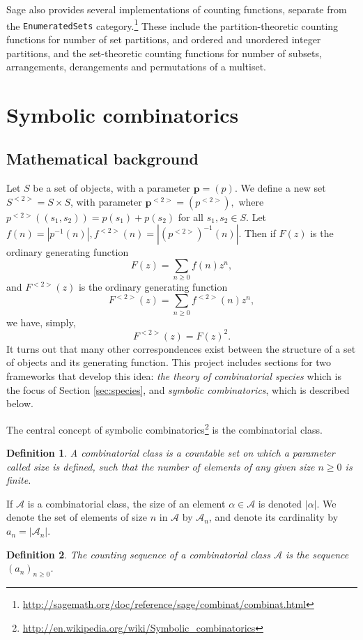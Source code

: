 \documentclass[12pt]{article}
\theoremstyle{plain}
\newtheorem{defin}{Definition}
\newcommand{\codefont}[1]{{\fontshape{n}\texttt{#1}}}
\begin{document}
Sage also provides several implementations of counting functions, separate from the \codefont{EnumeratedSets} category.\footnote{
 \url{http://sagemath.org/doc/reference/sage/combinat/combinat.html}
}
These include the partition-theoretic counting functions for number of set partitions, and ordered and unordered integer partitions,
and the set-theoretic counting functions for number of subsets, arrangements, derangements and permutations of a multiset.





\section{Symbolic combinatorics}
\label{sec:symboliccombinatorics}
\subsection{Mathematical background}
\label{sec:symboliccombinatoricsbackground}
Let \(S\) be a set of objects, with a parameter \(\boldsymbol{p}=(p) \).
We define a new set \(S^{<2>} = S \times S\), with parameter \( \boldsymbol{p}^{<2>} = (p^{<2>}),\) where \( p^{<2>}((s_1, s_2)) = p(s_1) + p(s_2) \) for all \( s_1, s_2 \in S\).
Let \(f(n) = |p^{-1}(n)|, f^{<2>}(n) = |(p^{<2>})^{-1}(n)|\).
Then if  \(F(z)\) is the ordinary generating function
\[ F(z) = \sum_{n \geq 0} f(n) z^n, \]
and
\( F^{<2>}(z) \) is the ordinary generating function
\[ F^{<2>}(z) = \sum_{n \geq 0} f^{<2>}(n) z^n,\]
we have, simply,
\[ F^{<2>}(z) = F(z)^2. \]
It turns out that many other correspondences exist between the structure of a set of objects and its generating function.
This project includes sections for two frameworks that develop this idea:
\emph{the theory of combinatorial species} which is the focus of Section \ref{sec:species},
and
\emph{symbolic combinatorics},
which is described below.

The central concept of symbolic combinatorics\footnote{
 \url{http://en.wikipedia.org/wiki/Symbolic\_combinatorics}
} is the combinatorial class.
\begin{defin}
A \emph{combinatorial class} is a countable set on which a parameter called \emph{size} is defined, such that the number of elements of any given size \(n \geq 0 \) is finite.
\end{defin}
If \(\mathcal{A}\) is a combinatorial class, the size of an element \(\alpha \in \mathcal{A} \) is denoted \( |\alpha| \).
We denote the set of elements of size \(n\) in \(\mathcal{A}\) by \(\mathcal{A}_n\), and denote its cardinality by \( a_n = |\mathcal{A}_n| \).
\begin{defin}
The \emph{counting sequence} of a combinatorial class \(\mathcal{A}\) is the sequence \( (a_n)_{n\geq0} \).
\end{defin}
\end{document}
